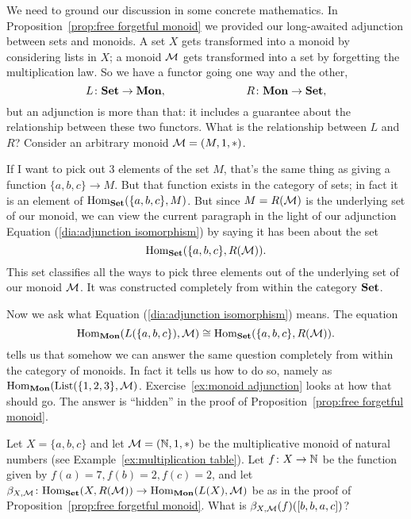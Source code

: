 \documentclass[CT4S-EN-RU]{subfiles}
\begin{document}
\begin{exampleENG}
We need to ground our discussion in some concrete mathematics. In Proposition~\ref{prop:free forgetful monoid} we provided our long-awaited adjunction between sets and monoids. A set $X$ gets transformed into a monoid by considering lists in $X$; a monoid $\mathcal{M}$ gets transformed into a set by forgetting the multiplication law. So we have a functor going one way and the other, 
$$L\colon{\mathbf{Set}}\rightarrow{\mathbf{Mon}},\hspace{1in}R\colon{\mathbf{Mon}}\rightarrow{\mathbf{Set}},$$
but an adjunction is more than that: it includes a guarantee about the relationship between these two functors. What is the relationship between $L$ and $R$? Consider an arbitrary monoid $\mathcal{M}=(M,1,*)$.

If I want to pick out 3 elements of the set $M$, that's the same thing as giving a function $\{a,b,c\}\to M$. But that function exists in the category of sets; in fact it is an element of $\textnormal{Hom}_{\mathbf{Set}}(\{a,b,c\},M)$. But since $M=R(\mathcal{M})$ is the underlying set of our monoid, we can view the current paragraph in the light of our adjunction Equation (\ref{dia:adjunction isomorphism}) by saying it has been about the set
$$\textnormal{Hom}_{\mathbf{Set}}(\{a,b,c\},R(\mathcal{M})).$$
This set classifies all the ways to pick three elements out of the underlying set of our monoid $\mathcal{M}$. It was constructed completely from within the category ${\mathbf{Set}}$.

Now we ask what Equation (\ref{dia:adjunction isomorphism}) means. The equation
$$\textnormal{Hom}_{\mathbf{Mon}}(L(\{a,b,c\}),\mathcal{M})\cong\textnormal{Hom}_{\mathbf{Set}}(\{a,b,c\},R(\mathcal{M})).$$
tells us that somehow we can answer the same question completely from within the category of monoids. In fact it tells us how to do so, namely as $\textnormal{Hom}_{\mathbf{Mon}}(\textnormal{List}(\{1,2,3\},\mathcal{M})$.  Exercise~\ref{ex:monoid adjunction} looks at how that should go. The answer is “hidden” in the proof of Proposition~\ref{prop:free forgetful monoid}.
\end{exampleENG}

\begin{exampleRUS}
\end{exampleRUS}

\begin{exerciseENG}\label{ex:monoid adjunction}
Let $X=\{a,b,c\}$ and let $\mathcal{M}=({\mathbb N},1,*)$ be the multiplicative monoid of natural numbers (see Example~\ref{ex:multiplication table}). Let $f\colon X\rightarrow{\mathbb N}$ be the function given by $f(a)=7, f(b)=2, f(c)=2$, and let $\beta_{X,\mathcal{M}}\colon\textnormal{Hom}_{\mathbf{Set}}(X,R(\mathcal{M}))\rightarrow\textnormal{Hom}_{\mathbf{Mon}}(L(X),\mathcal{M})$ be as in the proof of Proposition~\ref{prop:free forgetful monoid}. What is $\beta_{X,\mathcal{M}}(f)([b,b,a,c])$?
\end{exerciseENG}
\end{document}

